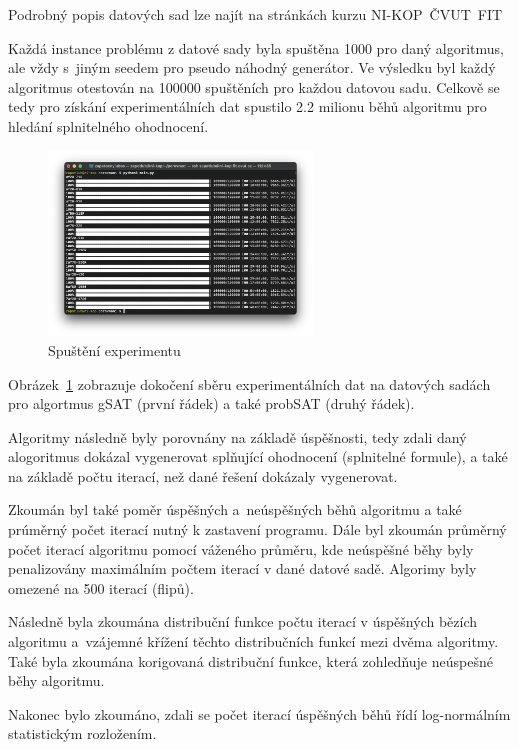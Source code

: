 \documentclass[twoside,twocolumn]{article}
\begin{document}
    Podrobný popis datových sad lze najít na stránkách kurzu NI-KOP~ČVUT~FIT~\cite{coursesData}

    Každá instance problému z datové sady byla spuštěna 1000 pro daný algoritmus, ale vždy s~jiným seedem pro pseudo náhodný generátor.
    Ve výsledku byl každý algoritmus otestován na 100000 spuštěních pro každou datovou sadu.
    Celkově se tedy pro získání experimentálních dat spustilo 2.2 milionu běhů algoritmu pro hledání splnitelného ohodnocení.

    \begin{figure}
        \centering
        \includegraphics[width=7cm]{images/generation}
        \caption{Spuštění experimentu}
        \label{fig:generation}
    \end{figure}

    Obrázek~\ref{fig:generation} zobrazuje dokočení sběru experimentálních dat na datových sadách pro algortmus gSAT (první řádek)
    a také probSAT (druhý řádek).

    Algoritmy následně byly porovnány na základě úspěšnosti, tedy zdali daný alogoritmus dokázal vygenerovat
    splňující ohodnocení (splnitelné formule), a také na základě počtu iterací, než dané řešení dokázaly vygenerovat.

    Zkoumán byl také poměr úspěšných a~neúspěšných běhů algoritmu a také prúměrný počet iterací nutný k zastavení programu.
    Dále byl zkoumán průměrný počet iterací algoritmu pomocí váženého průměru,
    kde neúspěšné běhy byly penalizovány maximálním počtem iterací v dané datové sadě.
    Algorimy byly omezené na 500 iterací (flipů).

    Následně byla zkoumána distribuční funkce počtu iterací v úspěšných bězích algoritmu a~vzájemné křížení
    těchto distribučních funkcí mezi dvěma algoritmy.
    Také byla zkoumána korigovaná distribuční funkce, která zohledňuje neúspešné běhy algoritmu.

    Nakonec bylo zkoumáno, zdali se počet iterací úspěšných běhů řídí log-normálním statistickým rozložením.
\end{document}
